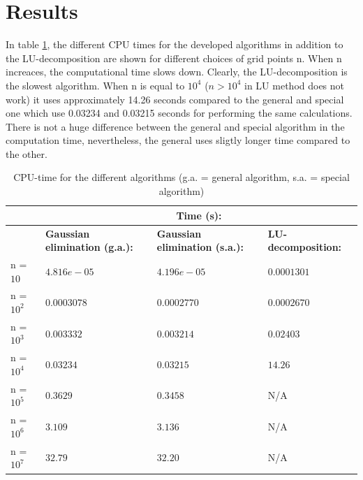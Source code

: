 \documentclass{article}
\begin{document}
\section{Results}

In  table \ref{tab:1}, the different CPU times for the developed algorithms in addition to the LU-decomposition are shown for different choices of grid points n. When n increaces, the computational time slows down. Clearly, the LU-decomposition is the slowest algorithm. When n is equal to $10^4$ ($n>10^4$ in LU method does not work) it uses approximately 14.26 seconds compared to the general and special one which use 0.03234 and 0.03215 seconds for performing the same calculations. There is not a huge difference between the general and special algorithm in the computation time, nevertheless, the general uses sligtly longer time compared to the other. 

\begin{table}[]
\begin{tabular}{llll}
           & \multicolumn{3}{c}{\textbf{Time (s):}}                                                                  \\ \hline
           & \textbf{Gaussian elimination (g.a.):} & \textbf{Gaussian elimination (s.a.):} & \textbf{LU-decomposition:} \\ \hline
n = $10$   & $4.816e-05$                              & $4.196e-05$                              & $0.0001301$       \\
n = $10^2$  & $0.0003078$                              & $0.0002770$                              & $0.0002670$       \\
n = $10^3$ & $0.003332$                               & $0.003214$                               & $0.02403$         \\
n = $10^4$ & $0.03234$                                & $0.03215$                                & $14.26$           \\
n = $10^5$ & $0.3629$                                 & $0.3458$                                 & N/A               \\
n = $10^6$ & $3.109$                                  & $3.136$                                  & N/A               \\
n = $10^7$ & $32.79$                                  & $32.20$                                  & N/A              
\end{tabular}
\label{tab:1}
\caption{CPU-time for the different algorithms (g.a. = general algorithm, s.a. = special algorithm)}
\end{table}
\end{document}
